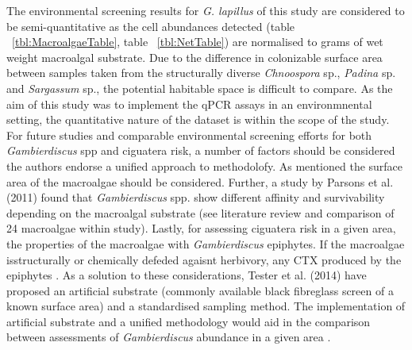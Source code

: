 \documentclass[12pt]{article}
\begin{document}
The environmental screening results for \emph{G. lapillus} of this study are considered to be semi-quantitative as the cell abundances detected (table ~\ref{tbl:MacroalgaeTable}, table ~\ref{tbl:NetTable}) are normalised to grams of wet weight macroalgal substrate. Due to the difference in colonizable surface area between samples taken from the structurally diverse \emph{Chnoospora} sp., \emph{Padina} sp. and \emph{Sargassum} sp., the potential habitable space is difficult to compare. As the aim of this study was to implement the qPCR assays in an environmnental setting, the quantitative nature of the dataset is within the scope of the study. For future studies and comparable environmental screening efforts for both \emph{Gambierdiscus} spp and ciguatera risk, a number of factors should be considered the authors endorse a unified approach to methodolofy. As mentioned the surface area of the macroalgae should be considered. Further, a study by Parsons et al. (2011) found that \emph{Gambierdiscus} spp. show different affinity and survivability depending on the macroalgal substrate (see literature review and comparison of 24 macroalgae within study). Lastly, for assessing ciguatera risk in a given area, the properties of the macroalgae with \emph{Gambierdiscus} epiphytes. If the macroalgae isstructurally or chemically defeded agaisnt herbivory, any CTX produced by the epiphytes \cite{cruz2006macroalgal}. As a solution to these considerations, Tester et al. (2014) have proposed an artificial substrate (commonly available black fibreglass screen of a known surface area) and a standardised sampling method.  %
The implementation of artificial substrate and a unified methodology would aid in the comparison between assessments of \emph{Gambierdiscus} abundance in a  given area \cite{tester2014sampling}.




\end{document}
